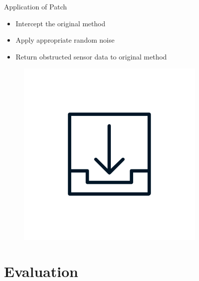 \documentclass[aspectratio=169]{beamer}
[aspectratio=169] %
\begin{document}
\begin{frame}{Application of Patch}
  \begin{minipage}{0.49\textwidth} 
    \begin{itemize}
      \item Intercept the original method
      \pause
      \item Apply appropriate random noise
      \pause
      \item Return obstructed sensor data to original method
    \end{itemize}
  \end{minipage}
  \hfill
  \begin{minipage}{0.49\textwidth} 
    \begin{figure}
      \centering
      \includegraphics[height=0.5\textheight]{figures/download.png}
    \end{figure}
  \end{minipage}
\end{frame}

\section{Evaluation}
\end{document}
